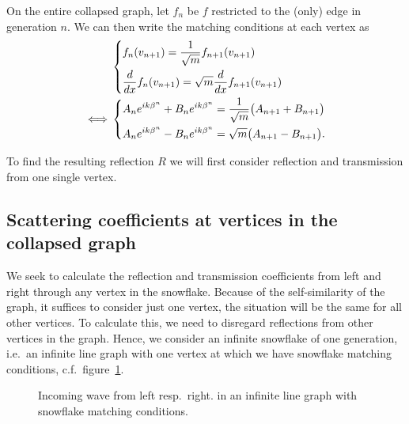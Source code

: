 On the entire collapsed graph, let $f_n$ be $f$ restricted to the (only) edge in generation $n$. We can then write the matching conditions at each vertex as
\begin{align*}
  &\begin{dcases}
    f_n(v_{n+1}) = \frac{1}{\sqrt{m}} f_{n+1}(v_{n+1}) \\
    \frac{d}{dx} f_n(v_{n+1}) = \sqrt{m} \frac{d}{dx} f_{n+1}(v_{n+1})
  \end{dcases} \\
  \iff &\begin{dcases}
    A_n e^{ik\beta^n} + B_n e^{ik\beta^n} = \frac{1}{\sqrt{m}} \big( A_{n+1} + B_{n+1} \big) \\
    A_n e^{ik\beta^n} - B_n e^{ik\beta^n} = \sqrt{m} \big( A_{n+1} - B_{n+1} \big).
  \end{dcases}
\end{align*}

To find the resulting reflection $R$ we will first consider reflection and transmission from one single vertex.




\subsection{Scattering coefficients at vertices in the collapsed graph}\label{sec: scattering at vertex}

We seek to calculate the reflection and transmission coefficients from left and right through any vertex in the snowflake. Because of the self-similarity of the graph, it suffices to consider just one vertex, the situation will be the same for all other vertices. To calculate this, we need to disregard reflections from other vertices in the graph. Hence, we consider an infinite snowflake of one generation, i.e.\ an infinite line graph with one vertex at which we have snowflake matching conditions, c.f.\ figure~\ref{fig: reflection transmission coefficients}.

\begin{figure}[!h]
  \centering
  \caption{Incoming wave from left resp.\ right. in an infinite line graph with snowflake matching conditions.}
  \label{fig: reflection transmission coefficients}
\end{figure}

